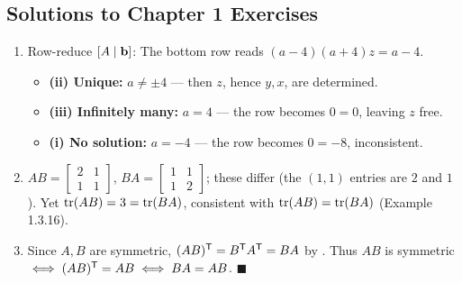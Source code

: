 \subsection*{Solutions to Chapter 1 Exercises}

\begin{enumerate}[label=\textbf{1.\arabic*},leftmargin=2.6em,itemsep=8pt]

\item Row-reduce $[A\mid\mathbf{b}]$:
The bottom row reads $(a-4)(a+4)z=a-4$.
\begin{itemize}[leftmargin=1.2em,itemsep=1pt]
\item \textbf{(ii) Unique:} $a\neq\pm4$ --- then $z$, hence $y,x$, are determined.
\item \textbf{(iii) Infinitely many:} $a=4$ --- the row becomes $0=0$, leaving $z$ free.
\item \textbf{(i) No solution:} $a=-4$ --- the row becomes $0=-8$, inconsistent.
\end{itemize}

\item $AB=\left[\begin{smallmatrix}2&1\\1&1\end{smallmatrix}\right]$, $BA=\left[\begin{smallmatrix}1&1\\1&2\end{smallmatrix}\right]$; these differ (the $(1,1)$ entries are $2$ and $1$). Yet $\operatorname{tr}(AB)=3=\operatorname{tr}(BA)$, consistent with $\operatorname{tr}(AB)=\operatorname{tr}(BA)$ (Example 1.3.16).

\item Since $A,B$ are symmetric, $(AB)^{\mathsf{T}}=B^{\mathsf{T}} A^{\mathsf{T}}=BA$ by . Thus $AB$ is symmetric $\iff (AB)^{\mathsf{T}}=AB\iff BA=AB$. \;$\blacksquare$


\end{enumerate}
